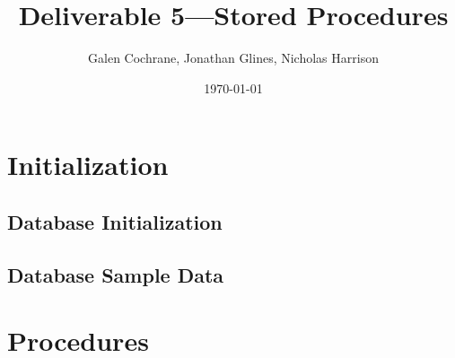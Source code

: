 \documentclass[12pt]{article}
\begin{document}
\lstset{breaklines=true,xleftmargin=-50pt}

\title{Deliverable 5---Stored Procedures}
\date{\today}
\author{Galen Cochrane, Jonathan Glines, Nicholas Harrison }

\maketitle

\tableofcontents

\newpage

\section{Initialization}
\subsection{Database Initialization}


\subsection{Database Sample Data}















\section{Procedures}
\end{document}
